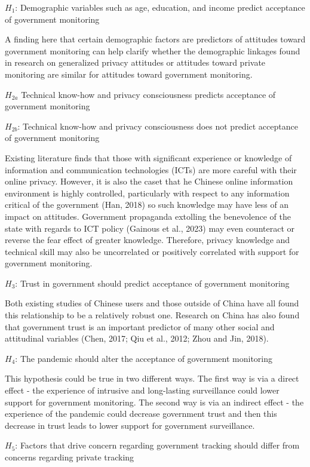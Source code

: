 \documentclass[
  letterpaper,
  DIV=11,
  numbers=noendperiod]{scrartcl}
\begin{document}
\(H_1\): Demographic variables such as age, education, and income
predict acceptance of government monitoring

A finding here that certain demographic factors are predictors of
attitudes toward government monitoring can help clarify whether the
demographic linkages found in research on generalized privacy attitudes
or attitudes toward private monitoring are similar for attitudes toward
government monitoring.

\(H_{2a}\) Technical know-how and privacy consciousness predicts
acceptance of government monitoring

\(H_{2b}\): Technical know-how and privacy consciousness does not
predict acceptance of government monitoring

Existing literature finds that those with significant experience or
knowledge of information and communication technologies (ICTs) are more
careful with their online privacy. However, it is also the caset that he
Chinese online information environment is highly controlled,
particularly with respect to any information critical of the government
(Han, 2018) so such knowledge may have less of an impact on attitudes.
Government propaganda extolling the benevolence of the state with
regards to ICT policy (Gainous et al., 2023) may even counteract or
reverse the fear effect of greater knowledge. Therefore, privacy
knowledge and technical skill may also be uncorrelated or positively
correlated with support for government monitoring.

\(H_3\): Trust in government should predict acceptance of government
monitoring

Both existing studies of Chinese users and those outside of China have
all found this relationship to be a relatively robust one. Research on
China has also found that government trust is an important predictor of
many other social and attitudinal variables (Chen, 2017; Qiu et al.,
2012; Zhou and Jin, 2018).

\(H_4\): The pandemic should alter the acceptance of government
monitoring

This hypothesis could be true in two different ways. The first way is
via a direct effect - the experience of intrusive and long-lasting
surveillance could lower support for government monitoring. The second
way is via an indirect effect - the experience of the pandemic could
decrease government trust and then this decrease in trust leads to lower
support for government surveillance.

\(H_5\): Factors that drive concern regarding government tracking should
differ from concerns regarding private tracking
\end{document}
